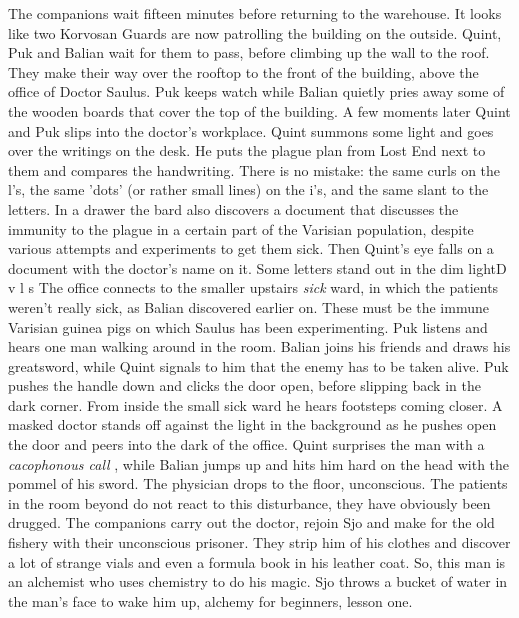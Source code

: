 The companions wait fifteen minutes before returning to the warehouse. It looks like two Korvosan Guards are now patrolling the building on the outside. Quint, Puk and Balian wait for them to pass, before climbing up the wall to the roof. They make their way over the rooftop to the front of the building, above the office of Doctor Saulus. Puk keeps watch while Balian quietly pries away some of the wooden boards that cover the top of the building. A few moments later Quint and Puk slips into the doctor's workplace. Quint summons some light and goes over the writings on the desk. He puts the plague plan from Lost End next to them and compares the handwriting. There is no mistake: the same curls on the l's, the same 'dots' (or rather small lines) on the i's, and the same slant to the letters. In a drawer the bard also discovers a document that discusses the immunity to the plague in a certain part of the Varisian population, despite various attempts and experiments to get them sick. Then Quint's eye falls on a document with the doctor's name on it. Some letters stand out in the dim lightD v l s The office connects to the smaller upstairs {\itshape sick} ward, in which the patients weren't really sick, as Balian discovered earlier on. These must be the immune Varisian guinea pigs on which Saulus has been experimenting. Puk listens and hears one man walking around in the room. Balian joins his friends and draws his greatsword, while Quint signals to him that the enemy has to be taken alive. Puk pushes the handle down and clicks the door open, before slipping back in the dark corner. From inside the small sick ward he hears footsteps coming closer. A masked doctor stands off against the light in the background as he pushes open the door and peers into the dark of the office. Quint surprises the man with a {\itshape cacophonous call} , while Balian jumps up and hits him hard on the head with the pommel of his sword. The physician drops to the floor, unconscious. The patients in the room beyond do not react to this disturbance, they have obviously been drugged. The companions carry out the doctor, rejoin Sjo and make for the old fishery with their unconscious prisoner. They strip him of his clothes and discover a lot of strange vials and even a formula book in his leather coat. So, this man is an alchemist who uses chemistry to do his magic. Sjo throws a bucket of water in the man's face to wake him up, alchemy for beginners, lesson one.\\

